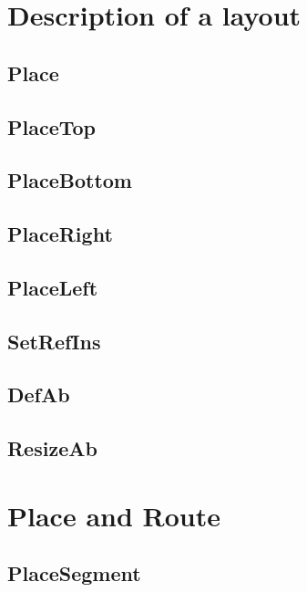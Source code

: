 \documentclass[12pt]{article}
\begin{document}
\section{Description of a layout}
\label{seclayout}

    \subsection{Place}
    \label{secplace}
    
    \subsection{PlaceTop}
    \label{sectop}
    
    \subsection{PlaceBottom}
    \label{secbottom}
    
    \subsection{PlaceRight}
    \label{secright}
    
    \subsection{PlaceLeft}
    \label{secleft}
    
    \subsection{SetRefIns}
    \label{secsetrefins}
    
    \subsection{DefAb}
    \label{secdefab}
    
    \subsection{ResizeAb}
    \label{secresizeab}
    
    
\section{Place and Route}
\label{secroute}

    \subsection{PlaceSegment}
    \label{secsegment}
    
\end{document}
